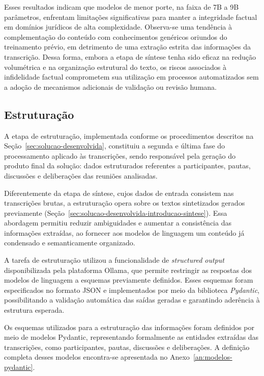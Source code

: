 Esses resultados indicam que modelos de menor porte, na faixa de 7B a 9B parâmetros, enfrentam limitações significativas para manter a integridade factual em domínios jurídicos de alta complexidade. Observa-se uma tendência à complementação do conteúdo com conhecimentos genéricos oriundos do treinamento prévio, em detrimento de uma extração estrita das informações da transcrição. Dessa forma, embora a etapa de síntese tenha sido eficaz na redução volumétrica e na organização estrutural do texto, os riscos associados à infidelidade factual comprometem sua utilização em processos automatizados sem a adoção de mecanismos adicionais de validação ou revisão humana.

\subsection{Estruturação}

A etapa de estruturação, implementada conforme os procedimentos descritos na Seção~\ref{sec:solucao-desenvolvida}, constituiu a segunda e última fase do processamento aplicado às transcrições, sendo responsável pela geração do produto final da solução: dados estruturados referentes a participantes, pautas, discussões e deliberações das reuniões analisadas.

Diferentemente da etapa de síntese, cujos dados de entrada consistem nas transcrições brutas, a estruturação opera sobre os textos sintetizados gerados previamente (Seção~\ref{sec:solucao-desenvolvida-introducao-sintese}). Essa abordagem permitiu reduzir ambiguidades e aumentar a consistência das informações extraídas, ao fornecer aos modelos de linguagem um conteúdo já condensado e semanticamente organizado.

A tarefa de estruturação utilizou a funcionalidade de \textit{structured output} disponibilizada pela plataforma Ollama, que permite restringir as respostas dos modelos de linguagem a esquemas previamente definidos. Esses esquemas foram especificados no formato JSON e implementados por meio da biblioteca \textit{Pydantic}, possibilitando a validação automática das saídas geradas e garantindo aderência à estrutura esperada.

Os esquemas utilizados para a estruturação das informações foram definidos por meio de modelos Pydantic, representando formalmente as entidades extraídas das transcrições, como participantes, pautas, discussões e deliberações. A definição completa desses modelos encontra-se apresentada no Anexo~\ref{an:modelos-pydantic}.


